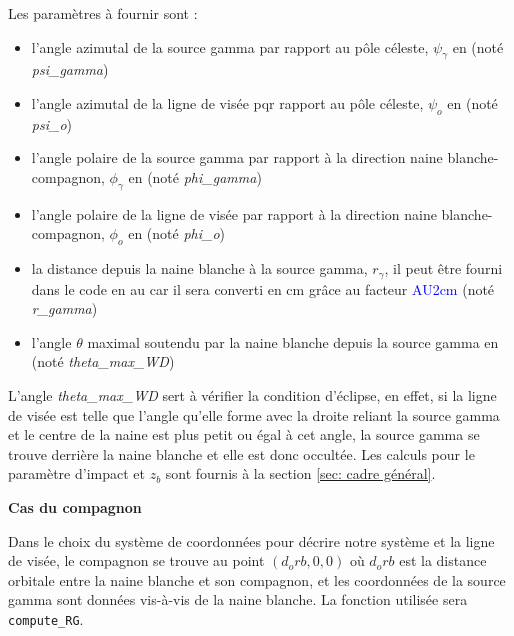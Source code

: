 \documentclass[a4paper,12pt,twoside]{article}
\begin{document}
\begin{appendices}
Les paramètres à fournir sont :
\begin{itemize}
	\item l'angle azimutal de la source gamma par rapport au pôle céleste, $\psi_\gamma$ en \si{\rad} (noté \textit{psi\_gamma})
    \item l'angle azimutal de la ligne de visée pqr rapport au pôle céleste, $\psi_o$ en \si{\rad} (noté \textit{psi\_o})
    \item l'angle polaire de la source gamma par rapport à la direction naine blanche-compagnon, $\phi_\gamma$ en \si{\rad} (noté \textit{phi\_gamma})
    \item l'angle polaire de la ligne de visée par rapport à la direction naine blanche-compagnon, $\phi_o$ en \si{\rad} (noté \textit{phi\_o})
    \item la distance depuis la naine blanche à la source gamma, $r_\gamma$, il peut être fourni dans le code en \si{\astronomicalunit} car il sera converti en \si{\cm} grâce au facteur \textcolor{blue}{AU2cm} (noté \textit{r\_gamma})
    \item l'angle $\theta$ maximal soutendu par la naine blanche depuis la source gamma en \si{\rad} (noté \textit{theta\_max\_WD})
\end{itemize}

L'angle \textit{theta\_max\_WD} sert à vérifier la condition d'éclipse, en effet, si la ligne de visée est telle que l'angle qu'elle forme avec la droite reliant la source gamma et le centre de la naine est plus petit ou égal à cet angle, la source gamma se trouve derrière la naine blanche et elle est donc occultée. Les calculs pour le paramètre d'impact et $z_b$ sont fournis à la section \ref{sec: cadre général}.

\textbf{Cas du compagnon}

Dans le choix du système de coordonnées pour décrire notre système et la ligne de visée, le compagnon se trouve au point $(d_orb, 0, 0)$ où $d_orb$ est la distance orbitale entre la naine blanche et son compagnon, et les coordonnées de la source gamma sont données vis-à-vis de la naine blanche. La fonction utilisée sera \texttt{compute\_RG}.


\end{appendices}
\end{document}
